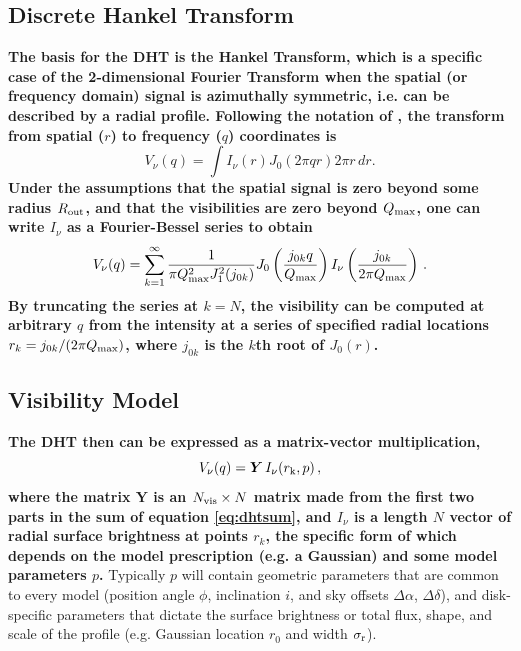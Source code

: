 \documentclass[fleqn,usenatbib]{mnras}
\begin{document}
\subsection{Discrete Hankel Transform}

\textbf{The basis for the DHT is the Hankel Transform, which is a specific case of the 2-dimensional Fourier Transform when the spatial (or frequency domain) signal is azimuthally symmetric, i.e. can be described by a radial profile. Following the notation of \citet{2020MNRAS.tmp.1491J}, the transform from spatial ($r$) to frequency ($q$) coordinates is
\begin{equation}\label{eq:hankel}
    V_\nu(q) = \int I_\nu(r) J_0(2\pi q r) 2 \pi r \, dr.
\end{equation}
Under the assumptions that the spatial signal is zero beyond some radius $R_{\rm out}$, and that the visibilities are zero beyond $Q_{\rm max}$, one can write $I_\nu$ as a Fourier-Bessel series to obtain
\begin{equation}\label{eq:dhtsum}
    V_\nu(q) = \sum_{k=1}^\infty \frac{1}{\pi Q_{\rm max}^2 J_1^2(j_{0k})} J_0 \left( \frac{j_{0k} q}{Q_{\rm max}} \right) I_\nu \left( \frac{j_{0k}}{2 \pi Q_{\rm max}} \right) \, .
\end{equation}
By truncating the series at $k=N$, the visibility can be computed at arbitrary $q$ from the intensity at a series of specified radial locations $r_k=j_{0k}/(2\pi Q_{\rm max})$, where $j_{0k}$ is the $k$th root of $J_0(r)$.}

\subsection{Visibility Model}

\textbf{The DHT then can be expressed as a matrix-vector multiplication,
\begin{equation}\label{eq:dht}
    V_\nu(q) = \boldsymbol{Y} \, I_\nu(r_{\rm k}, p) \, ,
\end{equation}
where the matrix $\boldsymbol{Y}$ is an $N_{\rm vis} \times N$ matrix made from the first two parts in the sum of equation \ref{eq:dhtsum}, and $I_\nu$ is a length $N$ vector of radial surface brightness at points $r_k$, the specific form of which depends on the model prescription (e.g. a Gaussian) and some model parameters $p$.} Typically $p$ will contain geometric parameters that are common to every model (position angle $\phi$, inclination $i$, and sky offsets $\Delta \alpha$, $\Delta \delta$), and disk-specific parameters that dictate the surface brightness or total flux, shape, and scale of the profile (e.g. Gaussian location $r_0$ and width $\sigma_{\rm r}$). %
\end{document}
